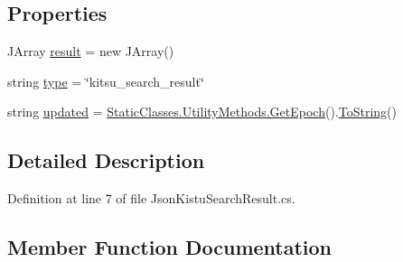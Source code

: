 \subsection*{Properties}
\begin{DoxyCompactItemize}
\item 
J\+Array \mbox{\hyperlink{class_little_weeb_library_1_1_models_1_1_json_kistu_search_result_adecaada095caebc883fc6aa89210a182}{result}} = new J\+Array()
\item 
string \mbox{\hyperlink{class_little_weeb_library_1_1_models_1_1_json_kistu_search_result_a600c0af2c31a9ac1403e96a65ad97074}{type}} = \char`\"{}kitsu\+\_\+search\+\_\+result\char`\"{}
\item 
string \mbox{\hyperlink{class_little_weeb_library_1_1_models_1_1_json_kistu_search_result_adbbddbd485f97ee9514b96cab4fba37e}{updated}} = \mbox{\hyperlink{class_little_weeb_library_1_1_static_classes_1_1_utility_methods_a12336d9e64983ddabaad8950486fafb2}{Static\+Classes.\+Utility\+Methods.\+Get\+Epoch}}().\mbox{\hyperlink{class_little_weeb_library_1_1_models_1_1_json_kistu_search_result_a24e08aec40ba54db7235bb4ef9be8b11}{To\+String}}()
\end{DoxyCompactItemize}


\subsection{Detailed Description}


Definition at line 7 of file Json\+Kistu\+Search\+Result.\+cs.



\subsection{Member Function Documentation}
\mbox{\label{class_little_weeb_library_1_1_models_1_1_json_kistu_search_result_a6adca32faf08b7fb63c9f469ab3fbcae}} 
